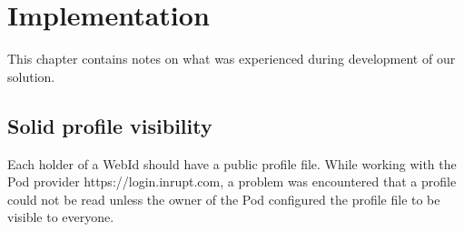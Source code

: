\chapter{Implementation}
This chapter contains notes on what was experienced during development of our solution.

\section*{Solid profile visibility}
Each holder of a WebId should have a public profile file.
While working with the Pod provider https://login.inrupt.com, a problem was encountered that a profile could not be read unless the owner of the Pod configured the profile file to be visible to everyone.
